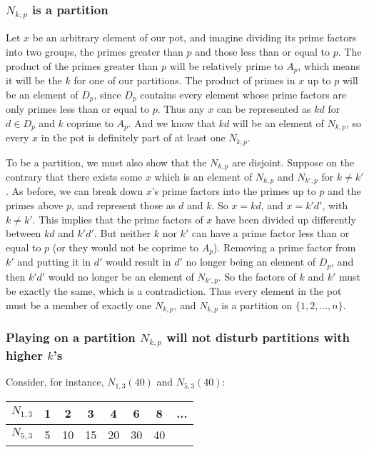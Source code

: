 \documentclass[a4paper,10pt]{amsart} %
\begin{document}
\subsubsection{$N_{k,p}$ is a partition} \label{partitionproof}
Let $x$ be an arbitrary element of our pot, and imagine dividing its prime factors into two groups, the primes greater than $p$ and those less than or equal to $p$. The product of the primes greater than $p$ will be relatively prime to $A_p$, which means it will be the $k$ for one of our partitions. The product of primes in $x$ up to $p$ will be an element of $D_p$, since $D_p$ contains every element whose prime factors are only primes less than or equal to $p$. Thus any $x$ can be represented as $kd$ for $d \in D_p$ and $k$ coprime to $A_p$. And we know that $kd$ will be an element of $N_{k,p}$, so every $x$ in the pot is definitely part of at least one $N_{k,p}$. 

To be a partition, we must also show that the $N_{k,p}$ are disjoint. Suppose on the contrary that there exists some $x$ which is an element of $N_{k,p}$ and $N_{k',p}$ for $k \neq k'$. As before, we can break down $x$'s prime factors into the primes up to $p$ and the primes above $p$, and represent those as $d$ and $k$. So $x = kd$, and $x = k'd'$, with $k \neq k'$. This implies that the prime factors of $x$ have been divided up differently between $kd$ and $k'd'$. But neither $k$ nor $k'$ can have a prime factor less than or equal to $p$ (or they would not be coprime to $A_p$). Removing a prime factor from $k'$ and putting it in $d'$ would result in $d'$ no longer being an element of $D_p$, and then $k'd'$ would no longer be an element of $N_{k',p}$. So the factors of $k$ and $k'$ must be exactly the same, which is a contradiction. Thus every element in the pot must be a member of exactly one $N_{k,p}$, and $N_{k,p}$ is a partition on $\{1, 2, \dots, n \}$.


\subsubsection{Playing on a partition $N_{k,p}$ will not disturb partitions with higher $k$'s}
Consider, for instance, $N_{1,3} (40)$ and $N_{5,3} (40)$:
\begin{center}
\begin{tabular}{ | c | c c c c c c c | }
    \hline
 $N_{1,3}$ & 1 & 2 & 3 & 4 & 6 & 8 & ... \\ 
 \hline
 $N_{5,3}$ & 5 & 10 & 15 & 20 & 30 & 40 &  \\  
 \hline
\end{tabular}
\end{center}
\end{document}
